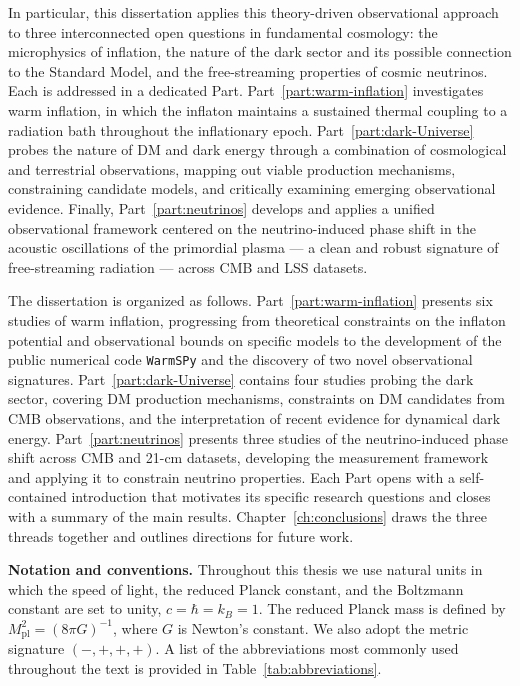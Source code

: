 In particular, this dissertation applies this theory-driven observational approach to three interconnected open questions in fundamental cosmology: the microphysics of inflation, the nature of the dark sector and its possible connection to the Standard Model, and the free-streaming properties of cosmic neutrinos. Each is addressed in a dedicated Part. Part~\ref{part:warm-inflation} investigates warm inflation, in which the inflaton maintains a sustained thermal coupling to a radiation bath throughout the inflationary epoch. Part~\ref{part:dark-Universe} probes the nature of DM and dark energy through a combination of cosmological and terrestrial observations, mapping out viable production mechanisms, constraining candidate models, and critically examining emerging observational evidence. Finally, Part~\ref{part:neutrinos} develops and applies a unified observational framework centered on the neutrino-induced phase shift in the acoustic oscillations of the primordial plasma --- a clean and robust signature of free-streaming radiation --- across CMB and LSS datasets.

\medskip

The dissertation is organized as follows. Part~\ref{part:warm-inflation} presents six studies of warm inflation, progressing from theoretical constraints on the inflaton potential and observational bounds on specific models to the development of the public numerical code \texttt{WarmSPy} and the discovery of two novel observational signatures. Part~\ref{part:dark-Universe} contains four studies probing the dark sector, covering DM production mechanisms, constraints on DM candidates from CMB observations, and the interpretation of recent evidence for dynamical dark energy. Part~\ref{part:neutrinos} presents three studies of the neutrino-induced phase shift across CMB and 21-cm datasets, developing the measurement framework and applying it to constrain neutrino properties. Each Part opens with a self-contained introduction that motivates its specific research questions and closes with a summary of the main results. Chapter~\ref{ch:conclusions} draws the three threads together and outlines directions for future work.

{ \bf Notation and conventions.}
Throughout this thesis we use natural units in which the speed of light, the reduced Planck constant, and the Boltzmann constant are set to unity, $c = \hbar = k_B = 1$. The reduced Planck mass is defined by $M_\mathrm{pl}^2 = (8\pi G)^{-1}$, where $G$ is Newton's constant. We also adopt the metric signature $(-,+,+,+)$. A list of the abbreviations most commonly used throughout the text is provided in Table~\ref{tab:abbreviations}.

